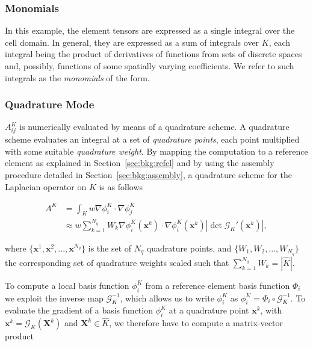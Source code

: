 \subsubsection{Monomials}
\label{sec:bkg:monomials}
In this example, the element tensors are expressed as a single integral over the cell domain. In general, they are expressed as a sum of integrals over $K$, each integral being the product of derivatives of functions from sets of discrete spaces and, possibly, functions of some spatially varying coefficients. We refer to such integrals as the \textit{monomials} of the form. 

\subsubsection{Quadrature Mode}
$A_{ij}^K$ is numerically evaluated by means of a quadrature scheme. A quadrature scheme evaluates an integral at a set of {\em quadrature points}, each point multiplied with some suitable {\em quadrature weight}. By mapping the computation to a reference element as explained in Section~\ref{sec:bkg:refel} and by using the assembly procedure detailed in Section~\ref{sec:bkg:assembly}, a quadrature scheme for the Laplacian operator on $K$ is as follows

\begin{equation}
\begin{split}
A^K & = \int_K w \nabla \phi_i^K \cdot \nabla \phi_j^K \\
& \approx w \sum_{k=1}^{N_q} W_k \nabla \phi_i^K(\boldsymbol{x}^k) \cdot \nabla \phi_i^K (\boldsymbol{x}^k) | \operatorname{det} \mathcal{G}_K'(\boldsymbol{x}^k) |,
\end{split}
\end{equation} 

where $\lbrace \boldsymbol{x}^1, \boldsymbol{x}^2, ..., \boldsymbol{x}^{N_q} \rbrace$ is the set of $N_q$ quadrature points, and $\lbrace W_1, W_2, ..., W_{N_q} \rbrace$ the corresponding set of quadrature weights scaled such that $\sum_{k=1}^{N_q} W_k = |\hat{K}|$. 

To compute a local basis function $\phi_i^K$ from a reference element basis function $\Phi_i$ we exploit the inverse map $\mathcal{G}_K^{-1}$, which allows us to write $\phi_i^K$ as $\phi_i^K = \Phi_i \circ \mathcal{G}_K^{-1}$. To evaluate the gradient of a basis function $\phi_i^K$ at a quadrature point $\boldsymbol{x}^k$, with $\boldsymbol{x}^k = \mathcal{G}_K(\boldsymbol{X}^k)$ and $\boldsymbol{X}^k \in \hat{K}$, we therefore have to compute a matrix-vector product

